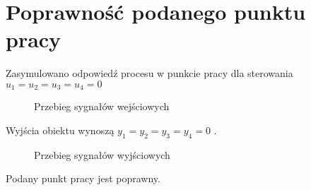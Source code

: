 \section{Poprawność podanego punktu pracy}
\label{projekt:zad1}

Zasymulowano	odpowiedź	procesu	w	punkcie	pracy	dla	sterowania	
$u_{1} = u_{2} = u_{3} = u_{4} = 0$	

\ifdefined\CompileFigures
   \begin{figure}[H] 
      \centering
      
      \caption{Przebieg sygnałów wejściowych}
      \label{projekt:zad1:figure:proj_zadanie1uu}
   \end{figure}
\fi

Wyjścia obiektu wynoszą $y_{1} = y_{2} = y_{3} = y_{4} = 0$	.

\ifdefined\CompileFigures
   \begin{figure}[H] 
      \centering
      
      \caption{Przebieg sygnałów wyjściowych}
      \label{projekt:zad1:figure:proj_zadanie1y}
   \end{figure}
\fi

Podany  punkt pracy jest poprawny.

\newpage
